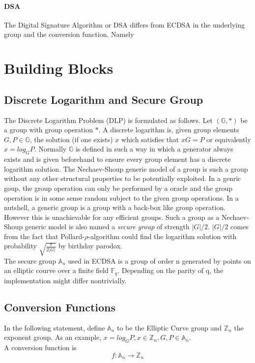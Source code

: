 \documentclass[12]{article}
\begin{document}
\paragraph{DSA}
The Digital Signature Algorithm or DSA differs from ECDSA in the underlying group and the conversion function. Namely


\section{Building Blocks}
\subsection{Discrete Logarithm and Secure Group}
The Discrete Logarithm Problem (DLP) is formulated as follows.
Let $(\mathbb{G}, *)$ be a group with group operation $*$.
A discrete logarithm is, given group elements $G,P \in \mathbb{G}$,
the solution (if one exists) $x$ which satisfies that $xG=P$
or equivalently $x=log_GP$.
Normally $\mathbb{G}$ is defined in such a way in which
 a generator always exists and is given beforehand
 to ensure every group element has a discrete logarithm solution.
The Nechaev-Shoup generic model of a group is such a group without
 any other structural properties to be potentially exploited.
 In a genric goup, the group operation can only be performed by a oracle
 and the group operation is in some sense random subject
 to the given group operations. In a nutshell, a generic group is a group with a back-box like group operation.
 However this is unachievable for any efficient groups.
  Such a group as a Nechaev-Shoup generic model is also named a \textit{secure group} of strength $|G|/2$. $|G|/2$ comes from the fact that Pollard-$\rho$-algorithm could find the logarithm solution with probability $\sqrt{\frac{\pi}{2|G|}}$ by birthday parodox.\\
  The secure group $\mathbb{A}_n$ used in ECDSA is a group of order n generated by points on an elliptic courve over a finite field $\mathbb{F}_q$.
  Depending on the parity of q, the implementation might differ nontrivially.

\subsection{Conversion Functions}
  In the following statement, define $\mathbb{A}_n$ to be the
  Elliptic Curve group and $\mathbb{Z}_n$ the exponent group.
  As an example, $x=log_GP, x \in \mathbb{Z}_n, G,P \in \mathbb{A}_n$.\\
  A conversion function is
  \begin{equation}
  f:\mathbb{A}_n \to \mathbb{Z}_n
  \end{equation}
\end{document}
